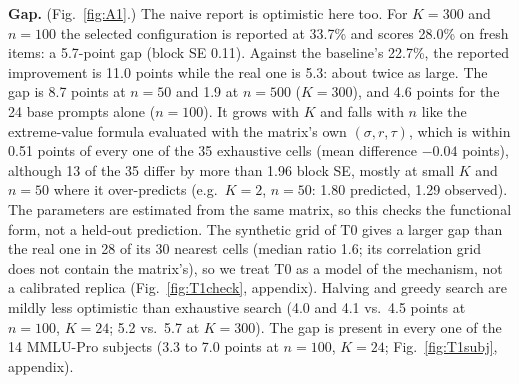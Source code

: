 \textbf{Gap.} (Fig.~\ref{fig:A1}.) The naive report is optimistic here too. For $K=300$ and $n=100$ the selected configuration is reported at 33.7\% and scores 28.0\% on fresh items: a 5.7-point gap (block SE 0.11). Against the baseline's 22.7\%, the reported improvement is 11.0 points while the real one is 5.3: about twice as large. The gap is 8.7 points at $n=50$ and 1.9 at $n=500$ ($K=300$), and 4.6 points for the 24 base prompts alone ($n=100$). It grows with $K$ and falls with $n$ like the extreme-value formula evaluated with the matrix's own $(\sigma,r,\tau)$, which is within 0.51 points of every one of the 35 exhaustive cells (mean difference $-0.04$ points), although 13 of the 35 differ by more than 1.96 block SE, mostly at small $K$ and $n=50$ where it over-predicts (e.g.\ $K=2$, $n=50$: 1.80 predicted, 1.29 observed). The parameters are estimated from the same matrix, so this checks the functional form, not a held-out prediction. The synthetic grid of T0 gives a larger gap than the real one in 28 of its 30 nearest cells (median ratio 1.6; its correlation grid does not contain the matrix's), so we treat T0 as a model of the mechanism, not a calibrated replica (Fig.~\ref{fig:T1check}, appendix). Halving and greedy search are mildly less optimistic than exhaustive search (4.0 and 4.1 vs.\ 4.5 points at $n=100$, $K=24$; 5.2 vs.\ 5.7 at $K=300$). The gap is present in every one of the 14 MMLU-Pro subjects (3.3 to 7.0 points at $n=100$, $K=24$; Fig.~\ref{fig:T1subj}, appendix).

